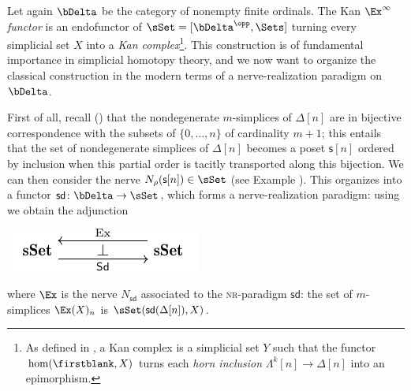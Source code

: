 \begin{example}\label{ex.sub}
Let again $\bDelta$ be the category of nonempty finite ordinals. The Kan $\Ex^\infty$ \emph{functor} is an endofunctor of $\sSet = [\bDelta^\opp,\Sets]$ turning every simplicial set $X$ into a \emph{Kan complex}\footnote{As defined in \cite{GoJ}, a Kan complex is a simplicial set $Y$ such that the functor $\hom(\firstblank,X)$ turns each \emph{horn inclusion} $\Lambda^k[n]\to \Delta[n]$ into an epimorphism.}. This construction is of fundamental importance in simplicial homotopy theory, and we now want to organize the classical construction in the modern terms of a nerve\hyp{}realization paradigm on $\bDelta$.

First of all, recall (\cite{GoJ}) that the nondegenerate $m$-simplices of $\Delta[n]$ are in bijective correspondence with the subsets of $\{0,\dots,n\}$ of cardinality $m+1$; this entails that the set of nondegenerate simplices of $\Delta[n]$ becomes a poset $\textsf{s}[n]$ ordered by inclusion when this partial order is tacitly transported along this bijection. We can then consider the nerve $N_\rho(\textsf{s}[n])\in\sSet$ (see Example ). This organizes into a functor $\textsf{sd}\colon \bDelta \to \sSet$, which forms a nerve\hyp{}realization paradigm: using \aprop{} we obtain the adjunction
\begin{center}
\includegraphics[scale=1]{figures/fig2}
\end{center}
where $\Ex$ is the nerve $N_\textsf{sd}$ associated to the \textsc{nr}\hyp{}paradigm $\textsf{sd}$: the set of $m$-simplices $\Ex(X)_n$ is $\sSet(\textsf{sd}(\Delta[n]), X)$.


\end{example}
